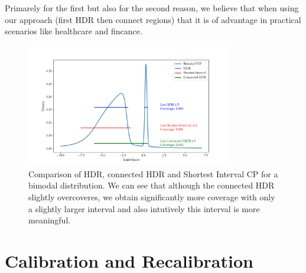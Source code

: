 Primarely for the first but also for the second reason, we believe that when using our approach (first HDR then connect regions) that it is of advantage in practical scenarios like healthcare and fincance.

\begin{figure}
    \centering
    \includegraphics[width=0.8\textwidth]{resources/bimodal_distribution_hdr_vs_shortest_interval.png}
    \caption[Comparison of HDR, connected HDR and Shortest Interval CP]{Comparison of HDR, connected HDR and Shortest Interval CP for a bimodal distribution. We can see that although the connected HDR slightly overcoveres, we obtain significantly more coverage with only a slightly larger interval and also intutively this interval is more meaningful.}
    \label{fig:hdr_vs_shortest_intervals}
\end{figure}


\section{Calibration and Recalibration}\label{sec:calibration}

